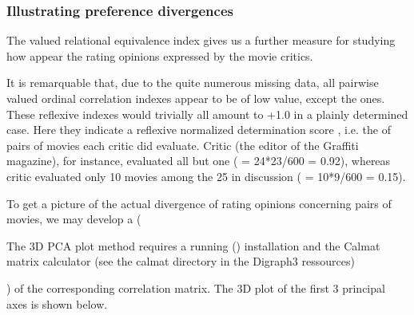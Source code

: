\documentclass[a4paper,10pt,english]{sphinxhowto}
\let\sphinxpxdimen\pdfpxdimen\else\newdimen\sphinxpxdimen
\begin{document}
\subsubsection{Illustrating preference divergences}
\label{\detokenize{tutorial:illustrating-preference-divergences}}
The valued relational equivalence index gives us a further measure for studying how  appear the rating opinions expressed by the movie critics.

\noindent{\hspace*{\fill}\sphinxincludegraphics[width=600\sphinxpxdimen]{{correlationTable}.png}\hspace*{\fill}}

It is remarquable that, due to the quite numerous missing data, all pairwise valued ordinal correlation indexes  appear to be of low value, except the  ones. These reflexive indexes  would trivially all amount to +1.0 in a plainly determined case. Here they indicate a reflexive normalized determination score , i.e. the  of pairs of movies each critic did evaluate. Critic  (the editor of the Graffiti magazine), for instance, evaluated all but one ( = 24*23/600 = 0.92), whereas critic  evaluated only 10 movies among the 25 in discussion ( = 10*9/600 = 0.15).

To get a picture of the actual divergence of rating opinions concerning  pairs of movies, we may develop a  (%
\begin{footnote}[10]\sphinxAtStartFootnote
The 3D PCA plot method requires a running   () installation and the Calmat matrix calculator (see the calmat directory in the Digraph3 ressources)
%
\end{footnote}) of the corresponding  correlation matrix. The 3D plot of the first 3 principal axes is shown below.

\begin{sphinxVerbatim}[commandchars=\\\{\}]
\end{sphinxVerbatim}
\end{document}
